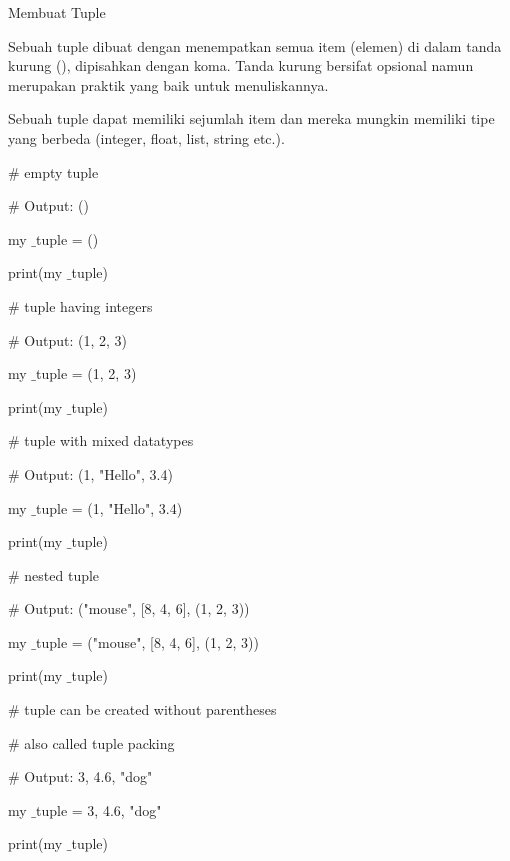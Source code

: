 \vspace{12pt}
Membuat Tuple \par
\vspace{12pt}
Sebuah tuple dibuat dengan menempatkan semua item (elemen) di dalam tanda kurung (), dipisahkan dengan koma. Tanda kurung bersifat opsional namun merupakan praktik yang baik untuk menuliskannya. \par
\vspace{12pt}
Sebuah tuple dapat memiliki sejumlah item dan mereka mungkin memiliki tipe yang berbeda (integer, float, list, string etc.). \par
\vspace{12pt}
\vspace{12pt}
 $  \#  $ empty tuple \par
 $  \#  $ Output: () \par
my $  \_  $tuple = () \par
print(my $  \_  $tuple) \par
\vspace{12pt}
 $  \#  $ tuple having integers \par
 $  \#  $ Output: (1, 2, 3) \par
my $  \_  $tuple = (1, 2, 3) \par
print(my $  \_  $tuple) \par
\vspace{12pt}
 $  \#  $ tuple with mixed datatypes \par
 $  \#  $ Output: (1, "Hello", 3.4) \par
my $  \_  $tuple = (1, "Hello", 3.4) \par
print(my $  \_  $tuple) \par
\vspace{12pt}
 $  \#  $ nested tuple \par
 $  \#  $ Output: ("mouse", [8, 4, 6], (1, 2, 3)) \par
my $  \_  $tuple = ("mouse", [8, 4, 6], (1, 2, 3)) \par
print(my $  \_  $tuple) \par
\vspace{12pt}
 $  \#  $ tuple can be created without parentheses \par
 $  \#  $ also called tuple packing \par
 $  \#  $ Output: 3, 4.6, "dog" \par
\vspace{12pt}
my $  \_  $tuple = 3, 4.6, "dog" \par
print(my $  \_  $tuple) \par
